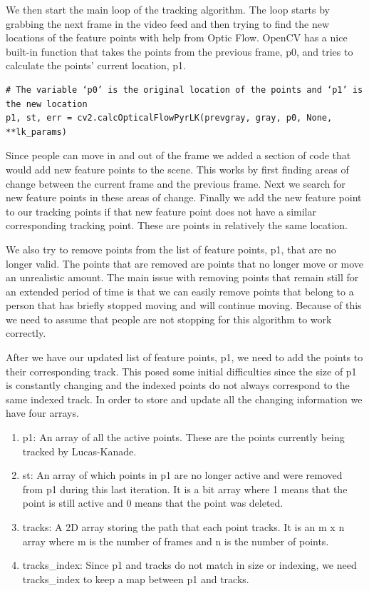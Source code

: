 \documentclass[12pt, onecolumn, conference]{IEEEtran}
\begin{document}
We then start the main loop of the tracking algorithm. The loop starts by grabbing the next frame in the video feed and then trying to find the new locations of the feature points with help from Optic Flow. OpenCV has a nice built-in function that takes the points from the previous frame, p0, and tries to calculate the points' current location, p1.

\begin{lstlisting}
# The variable ‘p0’ is the original location of the points and ‘p1’ is the new location
p1, st, err = cv2.calcOpticalFlowPyrLK(prevgray, gray, p0, None, **lk_params)
\end{lstlisting}

Since people can move in and out of the frame we added a section of code that would add new feature points to the scene. This works by first finding areas of change between the current frame and the previous frame. Next we search for new feature points in these areas of change. Finally we add the new feature point to our tracking points if that new feature point does not have a similar corresponding tracking point. These are points in relatively the same location.

We also try to remove points from the list of feature points, p1, that are no longer valid. The points that are removed are points that no longer move or move an unrealistic amount. The main issue with removing points that remain still for an extended period of time is that we can easily remove points that belong to a person that has briefly stopped moving and will continue moving. Because of this we need to assume that people are not stopping for this algorithm to work correctly.

After we have our updated list of feature points, p1, we need to add the points to their corresponding track. This posed some initial difficulties since the size of p1 is constantly changing and the indexed points do not always correspond to the same indexed track. In order to store and update all the changing information we have four arrays.

\begin{enumerate}
\item p1: An array of all the active points. These are the points currently being tracked by Lucas-Kanade.
\item st: An array of which points in p1 are no longer active and were removed from p1 during this last iteration. It is a bit array where 1 means that the point is still active and 0 means that the point was deleted.
\item tracks: A 2D array storing the path that each point tracks. It is an m x n array where m is the number of frames and n is the number of points.
\item tracks\_index: Since p1 and tracks do not match in size or indexing, we need tracks\_index to keep a map between p1 and tracks.
\end{enumerate}
\end{document}
